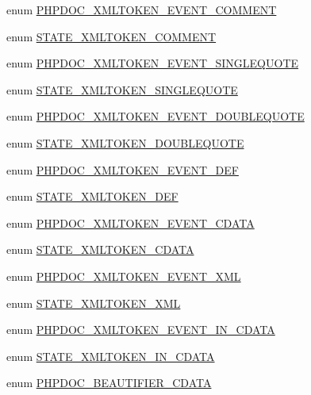 \begin{DoxyCompactItemize}
\item 
enum \hyperlink{_tokenizer_8php_a67746034b0a799bf0e1d97ed33d8d6be}{\-P\-H\-P\-D\-O\-C\-\_\-\-X\-M\-L\-T\-O\-K\-E\-N\-\_\-\-E\-V\-E\-N\-T\-\_\-\-C\-O\-M\-M\-E\-N\-T} 
\item 
enum \hyperlink{_tokenizer_8php_af4135764b121a379fd54080e80918889}{\-S\-T\-A\-T\-E\-\_\-\-X\-M\-L\-T\-O\-K\-E\-N\-\_\-\-C\-O\-M\-M\-E\-N\-T} 
\item 
enum \hyperlink{_tokenizer_8php_a2ee9b8708476c62f3cb10385ece42d52}{\-P\-H\-P\-D\-O\-C\-\_\-\-X\-M\-L\-T\-O\-K\-E\-N\-\_\-\-E\-V\-E\-N\-T\-\_\-\-S\-I\-N\-G\-L\-E\-Q\-U\-O\-T\-E} 
\item 
enum \hyperlink{_tokenizer_8php_a22e85363d5c5156bb7529cbffebd716b}{\-S\-T\-A\-T\-E\-\_\-\-X\-M\-L\-T\-O\-K\-E\-N\-\_\-\-S\-I\-N\-G\-L\-E\-Q\-U\-O\-T\-E} 
\item 
enum \hyperlink{_tokenizer_8php_aab97fc16e9e0d5973bf4e2a05fd5f7c1}{\-P\-H\-P\-D\-O\-C\-\_\-\-X\-M\-L\-T\-O\-K\-E\-N\-\_\-\-E\-V\-E\-N\-T\-\_\-\-D\-O\-U\-B\-L\-E\-Q\-U\-O\-T\-E} 
\item 
enum \hyperlink{_tokenizer_8php_a89384267c3d501618fda0d2212083a9d}{\-S\-T\-A\-T\-E\-\_\-\-X\-M\-L\-T\-O\-K\-E\-N\-\_\-\-D\-O\-U\-B\-L\-E\-Q\-U\-O\-T\-E} 
\item 
enum \hyperlink{_tokenizer_8php_a1a0dd58752b4ca3e751f0910ff724541}{\-P\-H\-P\-D\-O\-C\-\_\-\-X\-M\-L\-T\-O\-K\-E\-N\-\_\-\-E\-V\-E\-N\-T\-\_\-\-D\-E\-F} 
\item 
enum \hyperlink{_tokenizer_8php_a3791a844e876c2e66b358f336bf2cadb}{\-S\-T\-A\-T\-E\-\_\-\-X\-M\-L\-T\-O\-K\-E\-N\-\_\-\-D\-E\-F} 
\item 
enum \hyperlink{_tokenizer_8php_a97db7dafe38bce39265025a64238a44d}{\-P\-H\-P\-D\-O\-C\-\_\-\-X\-M\-L\-T\-O\-K\-E\-N\-\_\-\-E\-V\-E\-N\-T\-\_\-\-C\-D\-A\-T\-A} 
\item 
enum \hyperlink{_tokenizer_8php_a0e4eb9f676509cc5bc283ffe4bccf3e4}{\-S\-T\-A\-T\-E\-\_\-\-X\-M\-L\-T\-O\-K\-E\-N\-\_\-\-C\-D\-A\-T\-A} 
\item 
enum \hyperlink{_tokenizer_8php_a01ed1a84f396303a66f439104fac867c}{\-P\-H\-P\-D\-O\-C\-\_\-\-X\-M\-L\-T\-O\-K\-E\-N\-\_\-\-E\-V\-E\-N\-T\-\_\-\-X\-M\-L} 
\item 
enum \hyperlink{_tokenizer_8php_aa5644348a4d8886d0270a530dc79f905}{\-S\-T\-A\-T\-E\-\_\-\-X\-M\-L\-T\-O\-K\-E\-N\-\_\-\-X\-M\-L} 
\item 
enum \hyperlink{_tokenizer_8php_ac49f9bb56b49329b7b7940a2e905a306}{\-P\-H\-P\-D\-O\-C\-\_\-\-X\-M\-L\-T\-O\-K\-E\-N\-\_\-\-E\-V\-E\-N\-T\-\_\-\-I\-N\-\_\-\-C\-D\-A\-T\-A} 
\item 
enum \hyperlink{_tokenizer_8php_a025a8cdd06a6b9a2e033c17d33f2c988}{\-S\-T\-A\-T\-E\-\_\-\-X\-M\-L\-T\-O\-K\-E\-N\-\_\-\-I\-N\-\_\-\-C\-D\-A\-T\-A} 
\item 
enum \hyperlink{_tokenizer_8php_afcbc6eef5acb7c2fb8b4eaf88078c720}{\-P\-H\-P\-D\-O\-C\-\_\-\-B\-E\-A\-U\-T\-I\-F\-I\-E\-R\-\_\-\-C\-D\-A\-T\-A} 
\end{DoxyCompactItemize}


